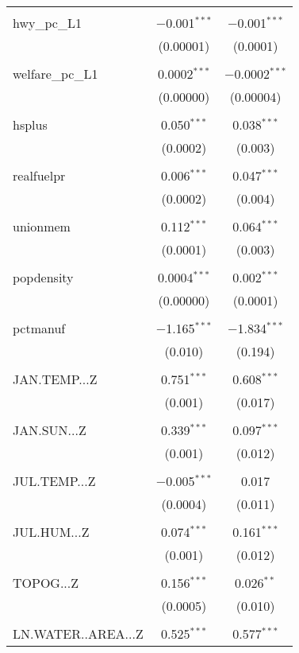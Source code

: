 \begin{table}[!htbp]
\begin{tabular}{@{\extracolsep{5pt}}lcc}
  & & \\ 
 hwy\_pc\_L1 & $-$0.001$^{***}$ & $-$0.001$^{***}$ \\ 
  & (0.00001) & (0.0001) \\ 
  & & \\ 
 welfare\_pc\_L1 & 0.0002$^{***}$ & $-$0.0002$^{***}$ \\ 
  & (0.00000) & (0.00004) \\ 
  & & \\ 
 hsplus & 0.050$^{***}$ & 0.038$^{***}$ \\ 
  & (0.0002) & (0.003) \\ 
  & & \\ 
 realfuelpr & 0.006$^{***}$ & 0.047$^{***}$ \\ 
  & (0.0002) & (0.004) \\ 
  & & \\ 
 unionmem & 0.112$^{***}$ & 0.064$^{***}$ \\ 
  & (0.0001) & (0.003) \\ 
  & & \\ 
 popdensity & 0.0004$^{***}$ & 0.002$^{***}$ \\ 
  & (0.00000) & (0.0001) \\ 
  & & \\ 
 pctmanuf & $-$1.165$^{***}$ & $-$1.834$^{***}$ \\ 
  & (0.010) & (0.194) \\ 
  & & \\ 
 JAN.TEMP...Z & 0.751$^{***}$ & 0.608$^{***}$ \\ 
  & (0.001) & (0.017) \\ 
  & & \\ 
 JAN.SUN...Z & 0.339$^{***}$ & 0.097$^{***}$ \\ 
  & (0.001) & (0.012) \\ 
  & & \\ 
 JUL.TEMP...Z & $-$0.005$^{***}$ & 0.017 \\ 
  & (0.0004) & (0.011) \\ 
  & & \\ 
 JUL.HUM...Z & 0.074$^{***}$ & 0.161$^{***}$ \\ 
  & (0.001) & (0.012) \\ 
  & & \\ 
 TOPOG...Z & 0.156$^{***}$ & 0.026$^{**}$ \\ 
  & (0.0005) & (0.010) \\ 
  & & \\ 
 LN.WATER..AREA...Z & 0.525$^{***}$ & 0.577$^{***}$ \\ 

\end{tabular}
\end{table}
